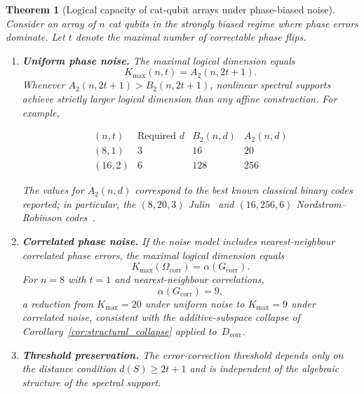 \documentclass[a4paper,twocolumn,11pt,allowtoday]{quantumarticle}
\theoremstyle{plain}
\newtheorem{theorem}{Theorem}[section]
\theoremstyle{definition}
\theoremstyle{remark}
\begin{document}
\begin{theorem}[Logical capacity of cat-qubit arrays under phase-biased noise]
\label{thm:catq_logical_capacity}
Consider an array of $n$ cat qubits in the strongly biased regime
where phase errors dominate. Let $t$ denote the maximal number of
correctable phase flips.

\begin{enumerate}

\item[\textup{(i)}] \textbf{Uniform phase noise.}
The maximal logical dimension equals
\[
K_{\max}(n,t)=A_2(n,2t+1).
\]
Whenever $A_2(n,2t+1)>B_2(n,2t+1)$, nonlinear spectral supports
achieve strictly larger logical dimension than any affine construction.
For example,

\[
\renewcommand{\arraystretch}{1.2}
\begin{array}{c|c|c|c}
(n,t) & \text{Required } d & B_2(n,d) & A_2(n,d) \\
\hline
(8,1)  & 3 & 16  & 20  \\
(16,2) & 6 & 128 & 256
\end{array}
\]

The values for $A_2(n,d)$ correspond to the best known classical binary codes reported; in particular, the $(8,20,3)$ Julin~\cite{Julin1965} and $(16,256,6)$ Nordstrom--Robinson codes~\cite{NordstromRobinson1967}.

\item[\textup{(ii)}] \textbf{Correlated phase noise.}
If the noise model includes nearest-neighbour correlated phase
errors, the maximal logical dimension equals
\[
K_{\max}(\Omega_{\mathrm{corr}})
=
\alpha(G_{\mathrm{corr}}).
\]
For $n=8$ with $t=1$ and nearest-neighbour correlations,
\[
\alpha(G_{\mathrm{corr}})=9,
\]
a reduction from $K_{\max}=20$ under uniform noise to $K_{\max}=9$
under correlated noise, consistent with the additive-subspace collapse
of Corollary~\ref{cor:structural_collapse} applied to~$D_{\mathrm{corr}}$.

\item[\textup{(iii)}] \textbf{Threshold preservation.}
The error-correction threshold depends only on the distance
condition $d(S)\ge2t+1$ and is independent of the algebraic
structure of the spectral support.

\end{enumerate}
\end{theorem}
\end{document}
